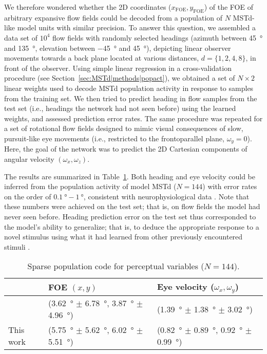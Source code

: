 We therefore wondered whether the 2D coordinates 
($x_{\mathrm{FOE}},y_{\mathrm{FOE}}$) of the \ac{FOE} of arbitrary expansive
flow fields could be decoded from a population of $N$ \ac{MSTd}-like model 
units with similar precision. To answer this question, we assembled a data 
set of $10^4$ flow fields with randomly selected headings (azimuth between
\SI{45}{\degree} and \SI{135}{\degree}, elevation between \SI{-45}{\degree}
and \SI{+45}{\degree}), depicting linear observer movements towards a back
plane located at various distances, $d=\{1,2,4,8\}$, in front of the observer.
Using simple linear regression in a cross-validation procedure (see 
Section~\ref{sec:MSTd|methods|popact}), we obtained a set of $N \times 2$
linear weights used to decode \ac{MSTd} population activity in response to 
samples from the training set. We then tried to predict heading in flow 
samples from the test set (i.e., headings the network had not seen before) 
using the learned weights, and assessed prediction error rates. The same 
procedure was repeated for a set of rotational flow fields designed to mimic
visual consequences of slow, pursuit-like eye movements (i.e., restricted to 
the frontoparallel plane, $\omega_y=0$). Here, the goal of the network was 
to predict the 2D Cartesian components of angular velocity 
$(\omega_x,\omega_z)$.

The results are summarized in Table~\ref{tbl:MSTd|FOE}.
Both heading and eye velocity could be inferred from the population activity 
of model \ac{MSTd} ($N=144$) with error rates on the order of 
$\SI{0.1}{\degree}-\SI{1}{\degree}$, consistent with neurophysiological data
\citep{BenHamed2003,PageDuffy2003}. Note that these numbers were achieved on
the test set; that is, on flow fields the model had never seen before. 
Heading prediction error on the test set thus corresponded to the model's 
ability to generalize; that is, to deduce the appropriate response to a 
novel stimulus using what it had learned from other previously encountered 
stimuli \citep{Hastie2009,SpanneJorntell2015}.

\begin{table}[t]
 \centering
 \caption{Sparse population code for perceptual variables ($N=144$).}
 \begin{tabular}{|lll|}
 \hline
  & FOE $(x,y)$ & Eye velocity ($\omega_x,\omega_y$) \\
 \hline
 \cite{BenHamed2003} & (\SI{3.62}{\degree} $\pm$ \SI{6.78}{\degree},
 	\SI{3.87}{\degree} $\pm$ \SI{4.96}{\degree})
    & (\SI{1.39}{\degree} $\pm$ \SI{1.38}{\degree} $\pm$ \SI{3.02}{\degree}) \\
 This work & (\SI{5.75}{\degree} $\pm$ \SI{5.62}{\degree}, 
 	\SI{6.02}{\degree} $\pm$ \SI{5.51}{\degree})
    & (\SI{0.82}{\degree} $\pm$ \SI{0.89}{\degree}, 
    \SI{0.92}{\degree} $\pm$ \SI{0.99}{\degree}) \\
 \hline
 \end{tabular}
 \label{tbl:MSTd|FOE}
\end{table}

